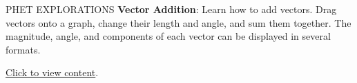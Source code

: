 \documentclass[main-ap-physics.tex]{subfiles}
\begin{document}
\begin{gradient}{PHET EXPLORATIONS}
    \textbf{Vector Addition}: Learn how to add vectors. Drag vectors onto a graph, change their length and angle, and sum them together. The magnitude, angle, and components of each vector can be displayed in several formats.

    \vspace{1em}

    \href{https://phet.colorado.edu/sims/html/vector-addition/latest/vector-addition_all.html}{Click to view content}.
\end{gradient}
\end{document}
